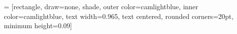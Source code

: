  = [rectangle, 
									draw=none, 
									shade, 
									outer color=camlightblue,
									inner color=camlightblue,
									text width=0.965\columnwidth,
									text centered,
									rounded corners=20pt,
									minimum height=0.09\columnwidth]

\newcommand{\mysection}[1]
{
\begin{center}
  \begin{tikzpicture}
    \node[mysection] {\color[rgb]{1,1,1}\sffamily\bfseries\LARGE#1};
  \end{tikzpicture}
\end{center}
}

%
%
%

\renewcommand{\familydefault}{cmss}
\sffamily


\newcommand{\background}[3]{
}





\newenvironment{pcolumn}[1]{
  \begin{minipage}{#1\textwidth}
  \begin{center}
}{
  \end{center}
  \end{minipage}
}






